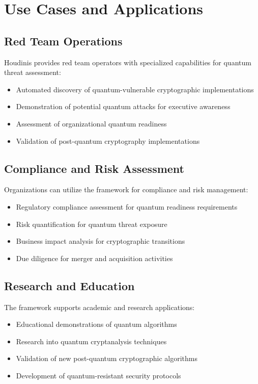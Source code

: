 \documentclass[11pt]{article}
\begin{document}
\section{Use Cases and Applications}

\subsection{Red Team Operations}

Houdinis provides red team operators with specialized capabilities for quantum threat assessment:

\begin{itemize}
\item Automated discovery of quantum-vulnerable cryptographic implementations
\item Demonstration of potential quantum attacks for executive awareness
\item Assessment of organizational quantum readiness
\item Validation of post-quantum cryptography implementations
\end{itemize}

\subsection{Compliance and Risk Assessment}

Organizations can utilize the framework for compliance and risk management:

\begin{itemize}
\item Regulatory compliance assessment for quantum readiness requirements
\item Risk quantification for quantum threat exposure
\item Business impact analysis for cryptographic transitions
\item Due diligence for merger and acquisition activities
\end{itemize}

\subsection{Research and Education}

The framework supports academic and research applications:

\begin{itemize}
\item Educational demonstrations of quantum algorithms
\item Research into quantum cryptanalysis techniques
\item Validation of new post-quantum cryptographic algorithms
\item Development of quantum-resistant security protocols
\end{itemize}
\end{document}
